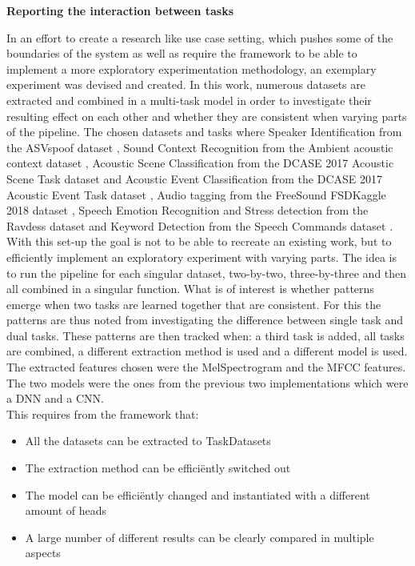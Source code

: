 
{\large \textbf{Reporting the interaction between tasks}}\\ \label{Design:implementations:experiment}

In an effort to create a research like use case setting, which pushes some of the boundaries of the system as well as require the framework to be able to implement a more exploratory experimentation methodology, an exemplary experiment was devised and created. In this work, numerous datasets are extracted and combined in a multi-task model in order to investigate their resulting effect on each other and whether they are consistent when varying parts of the pipeline. The chosen datasets and tasks where Speaker Identification from the ASVspoof dataset \cite{wu2015asvspoof}, Sound Context Recognition from the Ambient acoustic context dataset \cite{park2020augmenting}, Acoustic Scene Classification from the DCASE 2017 Acoustic Scene Task dataset  and Acoustic Event Classification from the DCASE 2017 Acoustic Event Task dataset \cite{mesaros2017dcase}, Audio tagging from the FreeSound FSDKaggle 2018 dataset \cite{fonseca2017freesound}, Speech Emotion Recognition and Stress detection from the Ravdess dataset \cite{livingstone2012ravdess} and Keyword Detection from the Speech Commands dataset  \cite{warden2018speech}. \\

With this set-up the goal is not to be able to recreate an existing work, but to efficiently implement an exploratory experiment with varying parts. The idea is to run the pipeline for each singular dataset, two-by-two, three-by-three and then all combined in a singular function. What is of interest is whether patterns emerge when two tasks are learned together that are consistent. For this the patterns are thus noted from investigating the difference between single task and dual tasks. These patterns are then tracked when: a third task is added, all tasks are combined, a different extraction method is used and a different model is used. The extracted features chosen were the MelSpectrogram and the MFCC features. The two models were the ones from the previous two implementations which were a DNN and a CNN. \\

This requires from the framework that:
\begin{itemize}
	\item All the datasets can be extracted to TaskDatasets
	\item The extraction method can be efficiëntly switched out
	\item The model can be efficiëntly changed and instantiated with a different amount of heads
	\item A large number of different results can be clearly compared in multiple aspects
\end{itemize}

